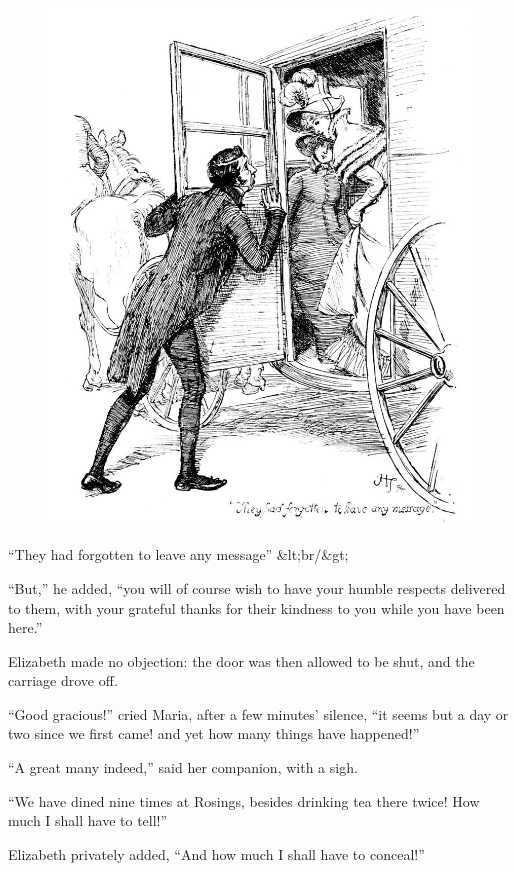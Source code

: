\documentclass[10pt]{book}
\begin{document}
\begin{figure}[h]
\centering
\includegraphics[width=\linewidth]{images/i_299.jpg}
\end{figure}

     “They had forgotten to leave any message”
     &lt;br/&gt;

   “But,” he added, “you will of course wish to have your humble respects
delivered to them, with your grateful thanks for their kindness to you
while you have been here.”
  

   Elizabeth made no objection: the door was then allowed to be shut, and
the carriage drove off.
  

   “Good gracious!” cried Maria, after a few minutes’ silence, “it seems
but a day or two since we first came! and yet how many things have
happened!”
  

   “A great many indeed,” said her companion, with a sigh.
  

   “We have dined nine times at Rosings, besides drinking tea there twice!
How much I shall have to tell!”
  

   Elizabeth privately added, “And how much I shall have to conceal!”
  
\end{document}
